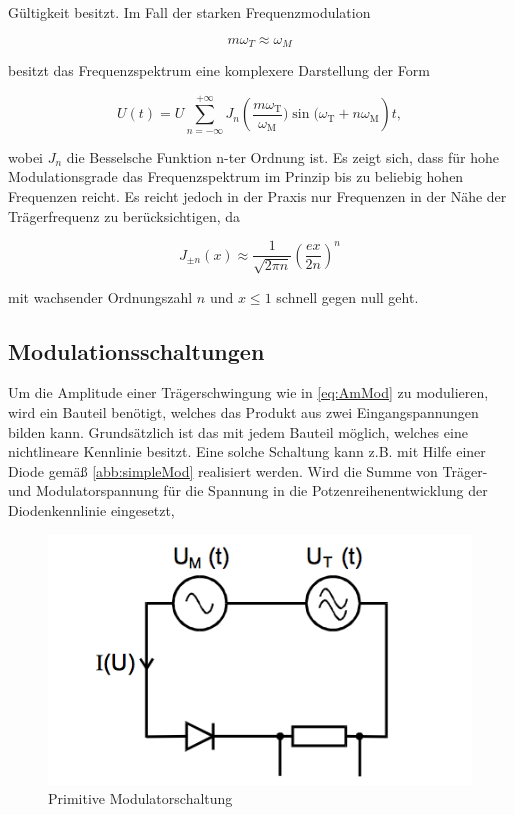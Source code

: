 \noindent Gültigkeit besitzt. Im Fall der starken Frequenzmodulation

\begin{equation}
m\omega_T \approx \omega_M
\end{equation}

\noindent besitzt das Frequenzspektrum eine komplexere Darstellung der Form

\begin{equation}
U(t) = U \sum_{n=-\infty}^{+\infty} J_{n}\left(\frac{m\omega_\text{T}}{\omega_\text{M}})\sin(\omega_\text{T} + n\omega_\text{M}\right)t,
\end{equation}

\noindent wobei $J_n$ die Besselsche Funktion n-ter Ordnung ist. Es zeigt sich, dass für hohe Modulationsgrade das Frequenzspektrum im Prinzip bis zu beliebig hohen Frequenzen reicht. Es reicht jedoch in der Praxis nur Frequenzen in der Nähe der Trägerfrequenz zu berücksichtigen, da

\begin{equation}
J_{\pm n}(x) \approx \frac{1}{\sqrt{2\pi n}}(\frac{ex}{2n})^n
\end{equation}

\noindent mit wachsender Ordnungszahl $n$ und $x \leq 1$ schnell gegen null geht.

\subsection{Modulationsschaltungen}
Um die Amplitude einer Trägerschwingung wie in \autoref{eq:AmMod} zu modulieren, wird ein Bauteil benötigt, welches das Produkt aus zwei Eingangspannungen bilden kann. Grundsätzlich ist das mit jedem Bauteil möglich, welches eine nichtlineare Kennlinie besitzt.
Eine solche Schaltung kann z.B. mit Hilfe einer Diode gemäß \autoref{abb:simpleMod} realisiert werden. Wird die Summe von Träger- und Modulatorspannung für die Spannung in die Potzenreihenentwicklung der Diodenkennlinie eingesetzt,

\begin{figure}
	\centering
	\includegraphics[width=\textwidth]{img/Abb4.png}
	\caption{Primitive Modulatorschaltung \cite{FP}}
	\label{abb:simpleMod}
\end{figure}

